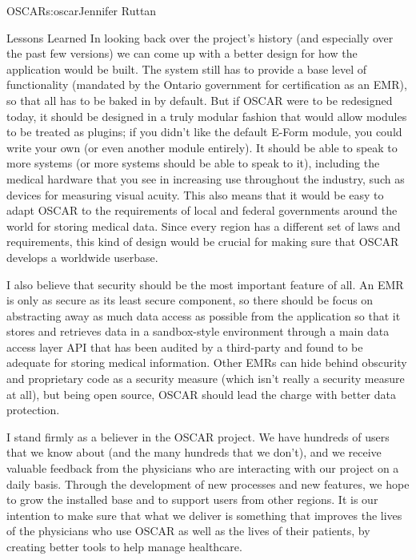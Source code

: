 \begin{aosachapter}{OSCAR}{s:oscar}{Jennifer Ruttan}
\begin{aosasect1}{Lessons Learned}
In looking back over the project's history (and especially over the
past few versions) we can come up with a better design for how the
application would be built. The system still has to provide a base
level of functionality (mandated by the Ontario government for
certification as an EMR), so that all has to be baked in by
default. But if OSCAR were to be redesigned today, it should be designed in a
truly modular fashion that would allow modules to be treated as
plugins; if you didn't like the default E-Form module, you could write
your own (or even another module entirely). It should be able to speak
to more systems (or more systems should be able to speak to it),
including the medical hardware that you see in increasing use throughout
the industry, such as devices for measuring visual acuity. This also
means that it would be easy to adapt OSCAR to the requirements of
local and federal governments around the world for storing medical
data. Since every region has a different set of laws and requirements,
this kind of design would be crucial for making sure that OSCAR
develops a worldwide userbase.

I also believe that security should be the most important feature of
all. An EMR is only as secure as its least secure component, so there
should be focus on abstracting away as much data access as possible
from the application so that it stores and retrieves data in a
sandbox-style environment through a main data access layer API that
has been audited by a third-party and found to be adequate for storing
medical information. Other EMRs can hide behind obscurity and
proprietary code as a security measure (which isn't really a security
measure at all), but being open source, OSCAR should lead the charge
with better data protection.

I stand firmly as a believer in the OSCAR project. We have
hundreds of users that we know about (and the many hundreds that we
don't), and we receive valuable feedback from the physicians who are
interacting with our project on a daily basis. Through the development
of new processes and new features, we hope to grow the installed base
and to support users from other regions. It is our intention to make
sure that what we deliver is something that improves the lives of the
physicians who use OSCAR as well as the lives of their patients, by
creating better tools to help manage healthcare.

\end{aosasect1}

\end{aosachapter}
